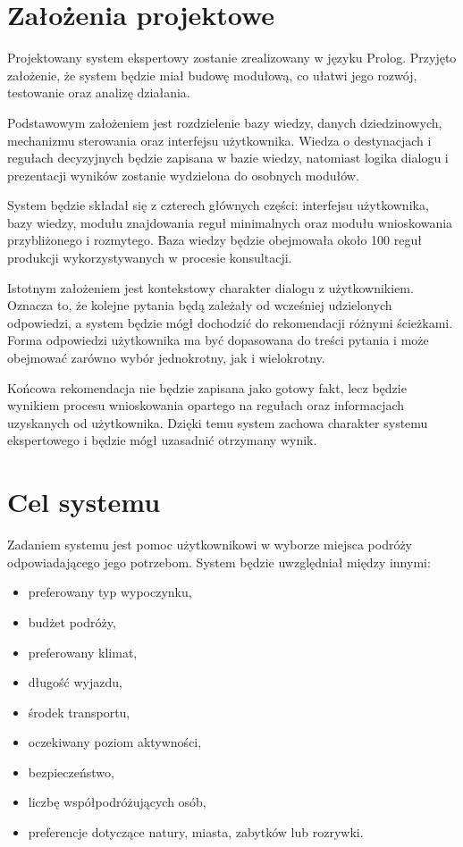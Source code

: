 \documentclass[12pt,a4paper]{article}
\begin{document}
\section{Założenia projektowe}

Projektowany system ekspertowy zostanie zrealizowany w języku Prolog. Przyjęto założenie, że system będzie miał budowę modułową, co ułatwi jego rozwój, testowanie oraz analizę działania.

Podstawowym założeniem jest rozdzielenie bazy wiedzy, danych dziedzinowych, mechanizmu sterowania oraz interfejsu użytkownika. Wiedza o destynacjach i regułach decyzyjnych będzie zapisana w bazie wiedzy, natomiast logika dialogu i prezentacji wyników zostanie wydzielona do osobnych modułów.

System będzie składał się z czterech głównych części: interfejsu użytkownika, bazy wiedzy, modułu znajdowania reguł minimalnych oraz modułu wnioskowania przybliżonego i rozmytego. Baza wiedzy będzie obejmowała około 100 reguł produkcji wykorzystywanych w procesie konsultacji.

Istotnym założeniem jest kontekstowy charakter dialogu z użytkownikiem. Oznacza to, że kolejne pytania będą zależały od wcześniej udzielonych odpowiedzi, a system będzie mógł dochodzić do rekomendacji różnymi ścieżkami. Forma odpowiedzi użytkownika ma być dopasowana do treści pytania i może obejmować zarówno wybór jednokrotny, jak i wielokrotny.

Końcowa rekomendacja nie będzie zapisana jako gotowy fakt, lecz będzie wynikiem procesu wnioskowania opartego na regułach oraz informacjach uzyskanych od użytkownika. Dzięki temu system zachowa charakter systemu ekspertowego i będzie mógł uzasadnić otrzymany wynik.

\newpage
\section{Cel systemu}

Zadaniem systemu jest pomoc użytkownikowi w wyborze miejsca podróży odpowiadającego jego potrzebom. System będzie uwzględniał między innymi:
\begin{itemize}
    \item preferowany typ wypoczynku,
    \item budżet podróży,
    \item preferowany klimat,
    \item długość wyjazdu,
    \item środek transportu,
    \item oczekiwany poziom aktywności,
    \item bezpieczeństwo,
    \item liczbę współpodróżujących osób,
    \item preferencje dotyczące natury, miasta, zabytków lub rozrywki.
\end{itemize}
\end{document}
